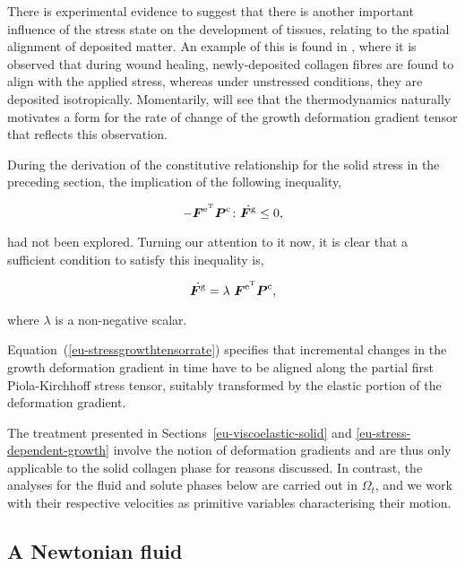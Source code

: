 There is experimental evidence to suggest that there is another
important influence of the stress state on the development of tissues,
relating to the spatial alignment of deposited matter.  An example of
this is found in \citet{Provenzanoetal:2003}, where it is observed
that during wound healing, newly-de\-po\-sit\-ed collagen fibres are
found to align with the applied stress, whereas under unstressed
conditions, they are deposited isotropically. Momentarily, will see
that the thermodynamics naturally motivates a form for the rate of
change of the growth deformation gradient tensor that reflects this
observation.

During the derivation of the constitutive relationship for the solid
stress in the preceding section, the implication of the following
inequality,

\begin{equation*}
- \mbox{\boldmath$ F$}^{\mathrm{e}^{\mathrm{T}}}  \mbox{\boldmath$ P$}^{\mathrm{c}} \colon
\dot{\mbox{\boldmath$ F$}^{\mathrm{g}}}
\leq 0,
\end{equation*}

\noindent had not been explored. Turning our attention to it now, it
is clear that a sufficient condition to satisfy this inequality is,

\begin{equation}
\dot{\bF^{\mathrm{g}}} = \lambda\ \bF^{\mathrm{e}^{\mathrm{T}}}
\bP^{\mathrm{c}},
\label{eu-stressgrowthtensorrate}
\end{equation}

\noindent where $\lambda$ is a non-negative scalar. 

Equation~(\ref{eu-stressgrowthtensorrate}) specifies that incremental
changes in the growth deformation gradient in time have to be aligned
along the partial first Piola-Kirchhoff stress tensor, suitably
transformed by the elastic portion of the deformation gradient.

The treatment presented in Sections~\ref{eu-viscoelastic-solid} and
\ref{eu-stress-dependent-growth} involve the notion of deformation
gradients and are thus only applicable to the solid collagen phase for
reasons discussed. In contrast, the analyses for the fluid and solute
phases below are carried out in $\Omega_{t}$, and we work with their
respective velocities as primitive variables characterising their
motion.
 
\subsection{A Newtonian fluid}
\label{eu-newtonian-fluid}

